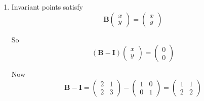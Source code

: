 \documentclass[leqno]{article}
\begin{document}
\begin{enumerate}[
  label=\textbf{\arabic*.},
  leftmargin=*,
  topsep=0pt,
  partopsep=0pt,
  parsep=0pt
]
\begin{djsSolution}
\begin{enumerate}[label=\textbf{(\roman*)}]
Now
\[
\mathbf A-\mathbf I=
\begin{pmatrix}
a-1 & b\\
c & d-1
\end{pmatrix}
=
\begin{pmatrix}
b+1 & b\\
d & d-1
\end{pmatrix}
\]

So
\begin{align*}
\det(\mathbf A-\mathbf I)
&=(b+1)(d-1)-bd\\
&=bd-b+d-1-bd\\
&=d-b-1
\end{align*}

Setting this equal to $0$ gives
\[
d-b-1=0
\]

Hence
\[
b=d-1
\]

Then
\[
a=b+2=d+1,\qquad c=d
\]

If we choose $d=3$, then
\[
b=2,\qquad a=4,\qquad c=3
\]

So one possible matrix is
\[
\mathbf A=
\begin{pmatrix}
4&2\\
3&3
\end{pmatrix}
\]

\item Invariant points satisfy
\[
\mathbf B\begin{pmatrix}x\\y\end{pmatrix}=\begin{pmatrix}x\\y\end{pmatrix}
\]

So
\[
(\mathbf B-\mathbf I)\begin{pmatrix}x\\y\end{pmatrix}=\begin{pmatrix}0\\0\end{pmatrix}
\]

Now
\[
\mathbf B-\mathbf I=
\begin{pmatrix}
2&1\\
2&3
\end{pmatrix}
-
\begin{pmatrix}
1&0\\
0&1
\end{pmatrix}
=
\begin{pmatrix}
1&1\\
2&2
\end{pmatrix}
\]


\end{enumerate}
\end{djsSolution}
\end{enumerate}
\end{document}
